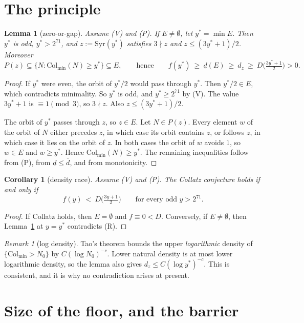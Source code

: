 \documentclass[11pt]{article}
\newtheorem{lemma}[theorem]{Lemma}
\newtheorem{corollary}[theorem]{Corollary}
\theoremstyle{remark}
\newtheorem{remark}[theorem]{Remark}
\newcommand{\Col}{\mathrm{Col}}
\newcommand{\Syr}{\mathrm{Syr}}
\newcommand{\dlow}{\underline{d}}
\newcommand{\dup}{\overline{d}}
\begin{document}
\section{The principle}
\begin{lemma}[zero-or-gap]\label{lem:gap}
Assume (V) and (P). If $E\neq\emptyset$, let $y^*=\min E$. Then $y^*$ is odd, $y^*>2^{71}$,
and $z:=\Syr(y^*)$ satisfies $3\nmid z$ and $z\le(3y^*+1)/2$. Moreover
\[
P(z)\subseteq\{N:\Col_{\min}(N)\ge y^*\}\subseteq E,
\qquad\text{hence}\qquad
f(y^*)\ \ge\ \dlow(E)\ \ge\ d_z\ \ge\ D\big(\tfrac{3y^*+1}{2}\big)>0 .
\]
\end{lemma}
\begin{proof}
If $y^*$ were even, the orbit of $y^*/2$ would pass through $y^*$. Then $y^*/2\in E$, which
contradicts minimality. So $y^*$ is odd, and $y^*\ge2^{71}$ by (V). The value $3y^*+1$ is
$\equiv1\pmod 3$, so $3\nmid z$. Also $z\le(3y^*+1)/2$.

The orbit of $y^*$ passes through $z$, so $z\in E$. Let $N\in P(z)$. Every element $w$ of the
orbit of $N$ either precedes $z$, in which case its orbit contains $z$, or follows $z$, in which
case it lies on the orbit of $z$. In both cases the orbit of $w$ avoids $1$, so $w\in E$ and
$w\ge y^*$. Hence $\Col_{\min}(N)\ge y^*$. The remaining inequalities follow from (P), from
$\dlow\le\dup$, and from monotonicity.
\end{proof}

\begin{corollary}[density race]\label{cor:race}
Assume (V) and (P). The Collatz conjecture holds if and only if
\[
f(y)\ <\ D\big(\tfrac{3y+1}{2}\big)\qquad\text{for every odd } y>2^{71}. \tag{R}
\]
\end{corollary}
\begin{proof}
If Collatz holds, then $E=\emptyset$ and $f\equiv0<D$. Conversely, if $E\neq\emptyset$, then
Lemma~\ref{lem:gap} at $y=y^*$ contradicts (R).
\end{proof}

\begin{remark}[log density]
Tao's theorem bounds the upper \emph{logarithmic} density of $\{\Col_{\min}>N_0\}$ by
$C(\log N_0)^{-c}$. Lower natural density is at most lower logarithmic density, so the lemma
also gives $d_z\le C(\log y^*)^{-c}$. This is consistent, and it is why no contradiction arises
at present.
\end{remark}

\section{Size of the floor, and the barrier}
\end{document}
